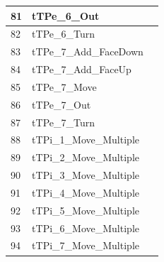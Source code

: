 \documentclass[runningheads,a4paper]{llncs}
\begin{document}
\begin{table}
\begin{tabular}{|l|l|l|}
		81 & tTPe\_6\_Out             &    \\ \hline
		82 & tTPe\_6\_Turn            &    \\ \hline
		83 & tTPe\_7\_Add\_FaceDown   &    \\ \hline
		84 & tTPe\_7\_Add\_FaceUp     &    \\ \hline
		85 & tTPe\_7\_Move            &    \\ \hline
		86 & tTPe\_7\_Out             &    \\ \hline
		87 & tTPe\_7\_Turn            &    \\ \hline
		88 & tTPi\_1\_Move\_Multiple  &    \\ \hline
		89 & tTPi\_2\_Move\_Multiple  &    \\ \hline
		90 & tTPi\_3\_Move\_Multiple  &    \\ \hline
		91 & tTPi\_4\_Move\_Multiple  &    \\ \hline
		92 & tTPi\_5\_Move\_Multiple  &    \\ \hline
		93 & tTPi\_6\_Move\_Multiple  &    \\ \hline
		94 & tTPi\_7\_Move\_Multiple  &    \\ \hline
	\end{tabular}\end{table}
\end{document}

